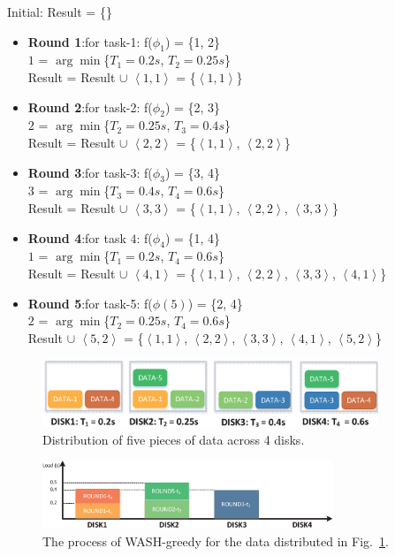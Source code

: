 \documentclass[conference]{IEEEtran}
\begin{document}
Initial: Result = \{\}
\begin{itemize}
	\item \textbf{Round 1}:for task-1:
	 f($\phi_1$) = \{1, 2\} \\
	 $1$ = $\arg\min$\{$T_1 = 0.2s$, $T_2 = 0.25s$\}\\
	Result = Result $\cup$ $\left \langle 1, 1\right \rangle$ = \{$\left \langle 1, 1\right \rangle$\}
	\item \textbf{Round 2}:for task-2:
	f($\phi_2$) = \{2, 3\}\\
	$2$ = $\arg\min$\{$T_2 = 0.25s$, $T_3 = 0.4s$\}\\
	Result = Result $\cup$ $\left \langle 2, 2\right \rangle$ = \{$\left \langle 1, 1\right \rangle$, $\left \langle 2, 2\right \rangle$\}
	\item \textbf{Round 3}:for task-3:
	f($\phi_3$) = \{3, 4\}\\
	$3$ = $\arg\min$\{$T_3 = 0.4s$, $T_4 = 0.6s$\}\\
	Result = Result $\cup$ $\left \langle 3, 3\right \rangle$ = \{$\left \langle 1, 1\right \rangle$, $\left \langle 2, 2\right \rangle$,  $\left \langle 3, 3\right \rangle$\}
	\item \textbf{Round 4}:for task  $4$:
	f($\phi_4$) = \{1, 4\}\\
	$1$ = $\arg\min$\{$T_1 = 0.2s$, $T_4 = 0.6s$\}\\
	Result = Result $\cup$ $\left \langle 4, 1\right \rangle$ = \{$\left \langle 1, 1\right \rangle$, $\left \langle 2, 2\right \rangle$,  $\left \langle 3, 3\right \rangle$, $\left \langle 4, 1\right \rangle$\}	
	\item \textbf{Round 5}:for task-5:
	f($\phi(5)$) = \{2, 4\}\\
	$2$ = $\arg\min$\{$T_2 = 0.25s$, $T_4 = 0.6s$\}\\
	Result $\cup$ $\left \langle 5, 2\right \rangle$ = \{$\left \langle 1, 1\right \rangle$, $\left \langle 2, 2\right \rangle$,  $\left \langle 3, 3\right \rangle$, $\left \langle 4, 1\right \rangle$, $\left \langle 5, 2\right \rangle$\}	
\end{itemize}

\begin{figure}[!t]
	\centering
	\includegraphics[height=0.8in]{fig1_10.eps}
	\caption{Distribution of five pieces of data across 4 disks.  }
	\label{fig1}
	\vspace{-0.4cm}
\end{figure}
\begin{figure}[!t]
	\centering
	\includegraphics[height=0.8in]{fig2_4.eps}
	\caption{The process of WASH-greedy for the data distributed in Fig.~\ref{fig1}. }
	\label{fig2}
	\vspace{-0.4cm}
\end{figure}
\end{document}
